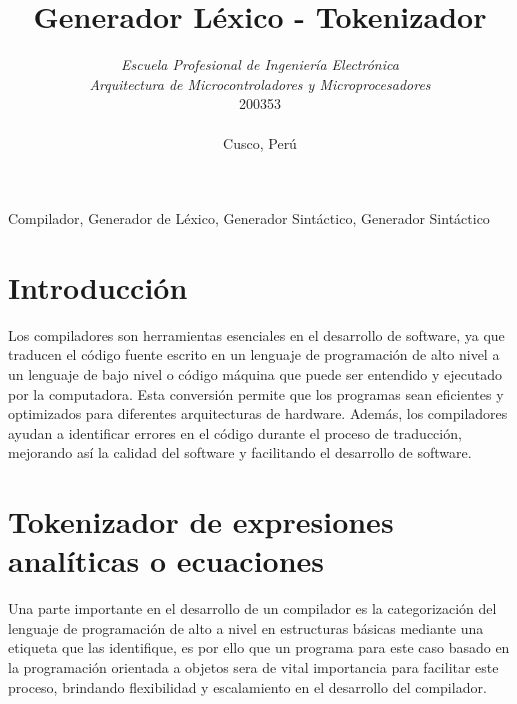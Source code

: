 \documentclass[conference]{IEEEtran}
\begin{document}
	
	\title{Generador Léxico - Tokenizador}
	\author{	
		\textit{Escuela Profesional de Ingeniería Electrónica}\\
		\textit{Arquitectura de Microcontroladores y Microprocesadores}\\
		200353 \\\\
		Cusco, Perú
	}
	
	\maketitle
	
	\begin{abstract}
	\end{abstract}
	
	\begin{IEEEkeywords}
		Compilador, Generador de Léxico, Generador Sintáctico, Generador Sintáctico
	\end{IEEEkeywords}
	
	\section{Introducción}
		Los compiladores son herramientas esenciales en el desarrollo de software, ya que traducen el código fuente escrito en un lenguaje de programación de alto nivel a un lenguaje de bajo nivel o código máquina que puede ser entendido y ejecutado por la computadora. Esta conversión permite que los programas sean eficientes y optimizados para diferentes arquitecturas de hardware. Además, los compiladores ayudan a identificar errores en el código durante el proceso de traducción, mejorando así la calidad del software y facilitando el desarrollo de software.
	
	\section{Tokenizador de expresiones analíticas o ecuaciones}
	
	Una parte importante en el desarrollo de un compilador es la categorización del lenguaje de programación de alto a nivel en estructuras básicas mediante una etiqueta que las identifique, es por ello que un programa para este caso basado en la programación orientada a objetos sera de vital importancia para facilitar este proceso, brindando flexibilidad y escalamiento en el desarrollo del compilador.
	
\end{document}
